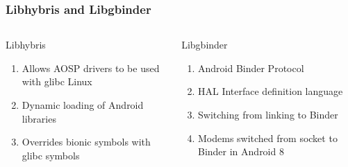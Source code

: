 \documentclass[
	notes=none,
	aspectratio=169
]{beamer}
\begin{document}

\begin{frame}
\frametitle{Libhybris and Libgbinder}

\begin{columns}[T]
\begin{column}[T]{0.5\textwidth}
\setlength{\parskip}{0.5em}

\vspace{0.4cm}
Libhybris
\begin{enumerate}
\setlength{\parskip}{0.5em}
\item Allows AOSP drivers to be used with glibc Linux
\item Dynamic loading of Android libraries
\item Overrides bionic symbols with glibc symbols
\end{enumerate}

\end{column}
\begin{column}[T]{0.5\textwidth}
\setlength{\parskip}{0.5em}

\vspace{0.4cm}
Libgbinder
\begin{enumerate}
\setlength{\parskip}{0.5em}
\item Android Binder Protocol
\item HAL Interface definition language
\item Switching from linking to Binder
\item Modems switched from socket to Binder in Android 8
\end{enumerate}

\end{column}
\end{columns}

\end{frame}
\note{
}

\end{document}
